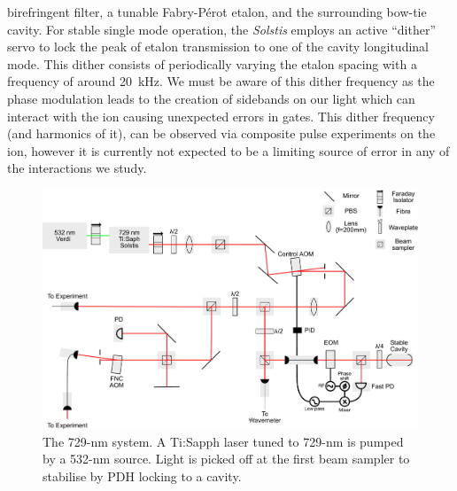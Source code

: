     birefringent filter, a tunable Fabry-P\'erot etalon, and the surrounding
    bow-tie cavity. For stable single mode operation, the \emph{Solstis} employs
    an active ``dither'' servo to lock the peak of etalon transmission to one of
    the cavity longitudinal mode. This dither consists of periodically varying
    the etalon spacing with a frequency of around 20~kHz. We must be aware of
    this dither frequency as the phase modulation leads to the creation of
    sidebands on our light which can interact with the ion causing unexpected
    errors in gates. This dither frequency (and harmonics of it), can be observed 
    via composite pulse experiments on the ion, however it is currently not
    expected to be a limiting source of error in any of the interactions
    we study.\\
    \begin{figure}
    \begin{center}
    \noindent\includegraphics[width=0.9\linewidth]{figures/pdf_figure/729_path_small.pdf}
    \end{center}
    \caption{The 729-nm system. A Ti:Sapph laser tuned to 729-nm is
        pumped by a 532-nm source. Light is picked off at the first beam
        sampler to stabilise by PDH locking to a cavity.}
    \label{fig:729}
    \end{figure}
